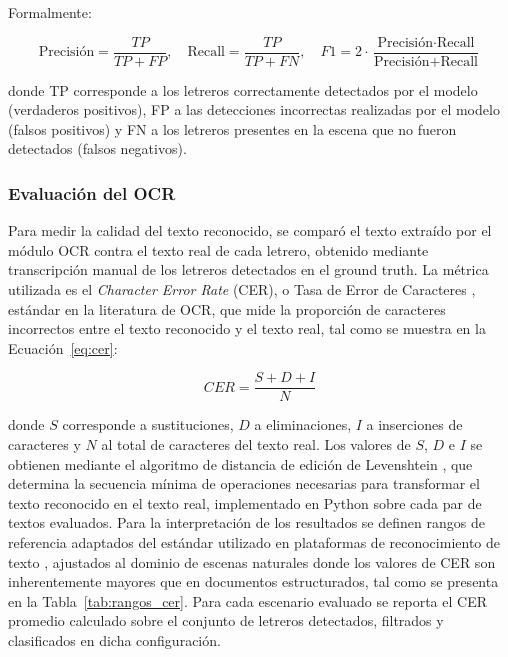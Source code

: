 \documentclass[runningheads]{llncs}
\begin{document}
Formalmente:

\begin{equation}
\text{Precisión} = \frac{TP}{TP + FP}, \quad
\text{Recall} = \frac{TP}{TP + FN}, \quad
F1 = 2 \cdot \frac{\text{Precisión} \cdot \text{Recall}}{\text{Precisión} + \text{Recall}}
\label{eq:metricas}
\end{equation}

donde TP corresponde a los letreros correctamente detectados por el 
modelo (verdaderos positivos), FP a las detecciones incorrectas 
realizadas por el modelo (falsos positivos) y FN a los letreros presentes
 en la escena que no fueron detectados (falsos negativos).

\subsubsection{Evaluación del OCR}
\label{subsec:evaluacion-ocr}
Para medir la calidad del texto reconocido, se comparó el texto extraído 
por el módulo OCR contra el texto real de cada letrero, obtenido mediante 
transcripción manual de los letreros detectados en el ground truth. La métrica
utilizada es el \textit{Character Error Rate} (CER), o Tasa de Error de Caracteres \cite{schaefer2020ocr}, estándar en la literatura de OCR, que 
mide la proporción de caracteres incorrectos entre el texto reconocido 
y el texto real, tal como se muestra en la Ecuación~\ref{eq:cer}:

\begin{equation}
CER = \frac{S + D + I}{N}
\label{eq:cer}
\end{equation}

donde $S$ corresponde a sustituciones, $D$ a eliminaciones, $I$ a 
inserciones de caracteres y $N$ al total de caracteres del texto real. 
Los valores de $S$, $D$ e $I$ se obtienen mediante el algoritmo de 
distancia de edición de Levenshtein \cite{levenshtein1966binary}, que 
determina la secuencia mínima de operaciones necesarias para transformar 
el texto reconocido en el texto real, implementado en Python sobre cada 
par de textos evaluados. Para la interpretación de los resultados se 
definen rangos de referencia adaptados del estándar utilizado en 
plataformas de reconocimiento de texto \cite{transkribus-cer}, ajustados 
al dominio de escenas naturales donde los valores de CER son 
inherentemente mayores que en documentos estructurados, tal como se 
presenta en la Tabla~\ref{tab:rangos_cer}. Para cada escenario 
evaluado se reporta el CER promedio calculado sobre el conjunto de 
letreros detectados, filtrados y clasificados en dicha configuración.
\end{document}
